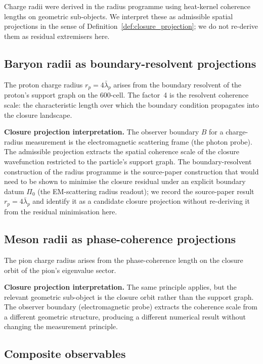 \documentclass[12pt]{article}
\newcommand{\lbar}{\bar{\lambda}}
\begin{document}
Charge radii were derived in the radius programme using heat-kernel coherence lengths on geometric sub-objects. We interpret these as admissible spatial projections in the sense of Definition~\ref{def:closure_projection}; we do not re-derive them as residual extremisers here.

\subsection{Baryon radii as boundary-resolvent projections}

The proton charge radius $r_p = 4\lbar_p$ arises from the boundary resolvent of the proton's support graph on the 600-cell. The factor~4 is the resolvent coherence scale: the characteristic length over which the boundary condition propagates into the closure landscape.

\textbf{Closure projection interpretation.} The observer boundary $B$ for a charge-radius measurement is the electromagnetic scattering frame (the photon probe). The admissible projection extracts the spatial coherence scale of the closure wavefunction restricted to the particle's support graph. The boundary-resolvent construction of the radius programme is the source-paper construction that would need to be shown to minimise the closure residual under an explicit boundary datum $\Pi_0$ (the EM-scattering radius readout); we record the source-paper result $r_p = 4\lbar_p$ and identify it as a candidate closure projection without re-deriving it from the residual minimisation here.

\subsection{Meson radii as phase-coherence projections}

The pion charge radius arises from the phase-coherence length on the closure orbit of the pion's eigenvalue sector.

\textbf{Closure projection interpretation.} The same principle applies, but the relevant geometric sub-object is the closure orbit rather than the support graph. The observer boundary (electromagnetic probe) extracts the coherence scale from a different geometric structure, producing a different numerical result without changing the measurement principle.

\subsection{Composite observables}
\end{document}
